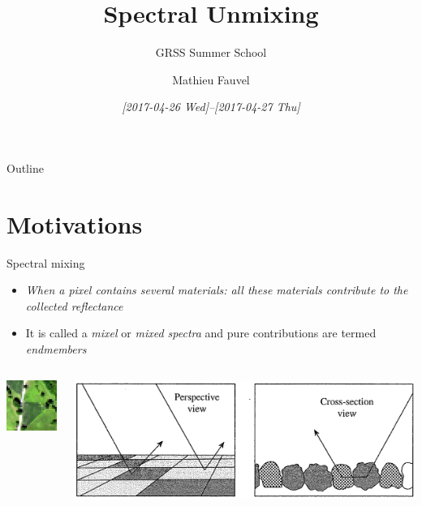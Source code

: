 \documentclass[10pt,aspectratio=1610]{beamer}
\author{Mathieu Fauvel}
\date{\textit{[2017-04-26 Wed]--[2017-04-27 Thu]}}
\title{Spectral Unmixing}
\subtitle{GRSS Summer School}
\institute{UMR Dynafor}
\begin{document}
\maketitle
\begin{frame}{Outline}
\tableofcontents
\end{frame}

\section{Motivations}
\label{sec:org229587f}
\begin{frame}[label={sec:orgf881324}]{Spectral mixing}
\begin{itemize}
\item \emph{When a pixel contains several materials: all these materials contribute to the collected reflectance}~\cite{manolakis2016hyperspectral}
\item It is called a \emph{mixel} or \emph{mixed spectra} and pure contributions are termed \emph{endmembers}
\end{itemize}
\begin{columns}
\begin{column}{0.3\columnwidth}
\begin{center}
\includegraphics[trim=1cm 2cm 2cm 1cm,clip=true,width=4cm]{./figures/46_8.jpg}
\end{center}
\end{column}
\begin{column}{0.7\columnwidth}
\begin{center}
\includegraphics[width=\textwidth]{./figures/mixing_process.png}
\end{center}
\end{column}
\end{columns}
\end{frame}
\end{document}
